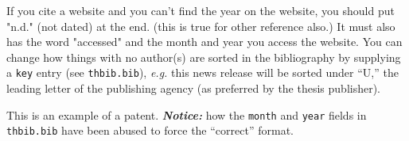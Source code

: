 If you cite a website \cite{Wikipedia} and you can't find the year on
the website, you should put "n.d." (not dated) at the end. (this is
true for other reference also.) It must also has the word "accessed"
and the month and year you access the website.  You can change how
things with no author(s) are sorted in the bibliography by supplying a
\verb+key+ entry (see \verb+thbib.bib+), \emph{e.g.} this news release
\cite{EPA-2010-09-07} will be sorted under ``U,'' the leading letter
of the publishing agency (as preferred by the thesis publisher).

This \cite{PatentExample} is an example of a patent.
\textbf{\textit{Notice:}} how the \texttt{month} and \texttt{year}
fields in \texttt{thbib.bib} have been abused to force the ``correct''
format.
